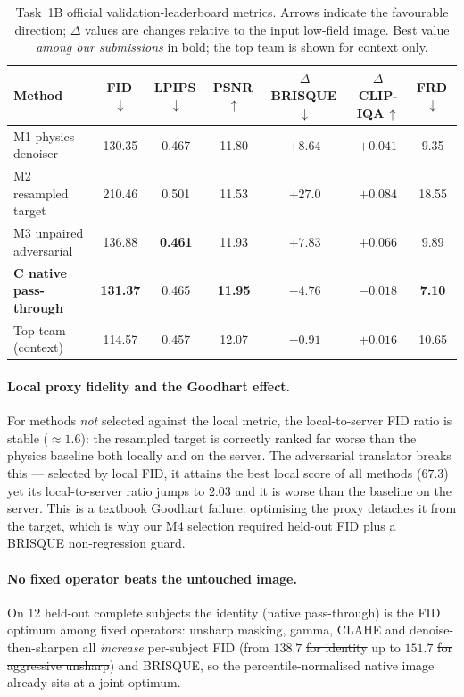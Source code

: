 \documentclass[runningheads]{llncs}
\newcommand{\delself}[1]{\textcolor{revself}{\sout{#1}}}
\begin{document}
\begin{table}[htbp]
\caption{Task~1B official validation-leaderboard metrics. Arrows indicate the
favourable direction; $\Delta$ values are changes relative to the input low-field
image. Best value \emph{among our submissions} in bold; the top team is shown for
context only.}
\label{tab:board}
\centering
\small
\begin{tabular}{lcccccc}
\toprule
Method & FID\,$\downarrow$ & LPIPS\,$\downarrow$ & PSNR\,$\uparrow$ &
$\Delta$BRISQUE\,$\downarrow$ & $\Delta$CLIP-IQA\,$\uparrow$ & FRD\,$\downarrow$ \\
\midrule
M1 physics denoiser        & 130.35 & 0.467 & 11.80 & $+8.64$ & $+0.041$ & 9.35 \\
M2 resampled target        & 210.46 & 0.501 & 11.53 & $+27.0$ & $+0.084$ & 18.55 \\
M3 unpaired adversarial    & 136.88 & \textbf{0.461} & 11.93 & $+7.83$ & \textbf{$+0.066$} & 9.89 \\
\textbf{C native pass-through} & \textbf{131.37} & 0.465 & \textbf{11.95} &
\textbf{$-4.76$} & $-0.018$ & \textbf{7.10} \\
\midrule
Top team (context)         & 114.57 & 0.457 & 12.07 & $-0.91$ & $+0.016$ & 10.65 \\
\bottomrule
\end{tabular}
\end{table}

\paragraph{Local proxy fidelity and the Goodhart effect.}
For methods \emph{not} selected against the local metric, the local-to-server FID
ratio is stable ($\approx1.6$): the resampled target is correctly ranked far
worse than the physics baseline both locally and on the server. The adversarial
translator breaks this --- selected by local FID, it attains the best local score
of all methods ($67.3$) yet its local-to-server ratio jumps to $2.03$ and it is
worse than the baseline on the server. This is a textbook Goodhart failure:
optimising the proxy detaches it from the target, which is why our M4 selection
required held-out FID plus a BRISQUE non-regression guard.

\paragraph{No fixed operator beats the untouched image.}
On 12 held-out complete subjects the identity (native pass-through) is the FID
optimum among fixed operators: unsharp masking, gamma, CLAHE and denoise-then-sharpen
all \emph{increase} per-subject FID (from $138.7$ \delself{for identity} up to $151.7$
\delself{for aggressive unsharp}) and BRISQUE, so the percentile-normalised native
image already sits at a joint optimum.
\end{document}
